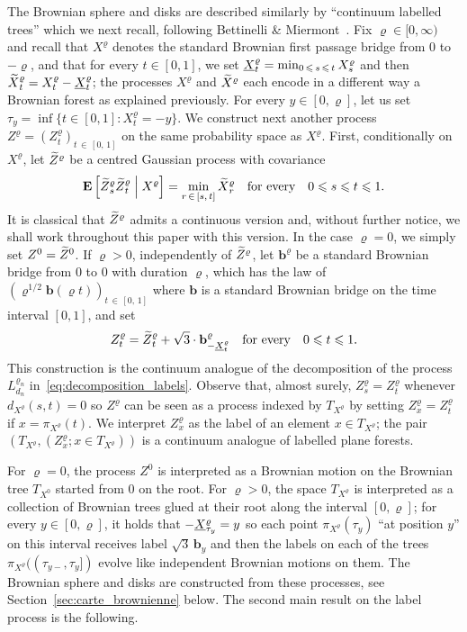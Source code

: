 \documentclass[AHL,Unicode,longabstracts,published]{cedram}
\newcommand{\ensembles}[1]{\mathbf{#1}}
\newcommand{\E}{\ensembles{E}}
\newcommand{\Esc}[2]{\E\left[#1 \;\middle|\; #2\right]}
\newcommand{\1}{\ensembles{1}}
\newcommand{\tildep}[1]{\widetilde{#1}\vphantom{#1}}
\newcommand{\underlinep}[1]{\underline{#1}\vphantom{#1}}
\newcommand{\bb}{\mathbf{b}}
\renewcommand{\le}{\leqslant}
\newcommand{\CRT}{T}
\newcommand{\dCRT}{d}
\newcommand{\Lfn}{L_{d_n}^{\varrho_n}}
\newcommand{\tX}{\tildep{X}^{\varrho}}
\begin{document}
The Brownian sphere and disks are described similarly by ``continuum labelled trees'' which we next recall, following Bettinelli \& Miermont~\cite{BM17}. Fix $\varrho \in [0, \infty)$ and recall that $X^\varrho$ denotes the standard Brownian first passage bridge from $0$ to $-\varrho$, and that for every $t \in [0,1]$, we set $\underlinep{X}^\varrho_t = \min_{0\,\le\,s\,\le\,t} X^\varrho_s$ and then $\tX_t = X^\varrho_t-\underlinep{X}^\varrho_t$; the processes $X^\varrho$ and $\tX$ each encode in a different way a Brownian forest as explained previously. For every $y \in [0,\varrho]$, let us set $\tau_y = \inf\{t \in [0,1] : X^\varrho_t = -y\}$. We construct next another process $Z^\varrho = (Z^\varrho_t)_{t\,\in\,[0,\,1]}$ on the same probability space as $X^\varrho$. First, conditionally on $X^\varrho$, let $\tildep{Z}^\varrho$ be a centred Gaussian process with covariance
\[
\Esc{\tildep{Z}^\varrho_s \tildep{Z}^\varrho_t}{X^\varrho} = \min_{r\,\in\,[s,\,t]} \tX_r
\quad\text{for every}\quad 0 \le s \le t \le 1.
\]
It is classical that $\tildep{Z}^\varrho$ admits a continuous version and, without further notice, we shall work throughout this paper with this version. In the case $\varrho = 0$, we simply set $Z^0 = \tildep{Z}^0$. If $\varrho > 0$, independently of $\tildep{Z}^\varrho$, let $\bb^\varrho$ be a standard Brownian bridge from $0$ to $0$ with duration $\varrho$, which has the law of $(\varrho^{1/2} \bb(\varrho t))_{t\,\in\,[0,\,1]}$ where $\bb$ is a standard Brownian bridge on the time interval $[0,1]$, and set
\[
Z^\varrho_t = \tildep{Z}^\varrho_t + \sqrt{3} \cdot \bb^\varrho_{- \underlinep{X}^\varrho_t}
\quad\text{for every}\quad 0 \le t \le 1.
\]
This construction is the continuum analogue of the decomposition of the process $\Lfn$ in~\eqref{eq:decomposition_labels}. Observe that, almost surely, $Z^\varrho_s = Z^\varrho_t$ whenever $\dCRT_{X^\varrho}(s, t) = 0$ so $Z^\varrho$ can be seen as a process indexed by $\CRT_{X^\varrho}$ by setting $Z^\varrho_x = Z^\varrho_t$ if $x = \pi_{X^\varrho}(t)$. We interpret $Z^\varrho_{x}$ as the label of an element $x \in \CRT_{X^\varrho}$; the pair $(\CRT_{X^\varrho}, (Z^\varrho_x; x \in \CRT_{X^\varrho}))$ is a continuum analogue of labelled plane forests.

For $\varrho = 0$, the process $Z^0$ is interpreted as a Brownian motion on the Brownian tree $\CRT_{X^0}$ started from $0$ on the root. For $\varrho > 0$, the space $\CRT_{X^\varrho}$ is interpreted as a collection of Brownian trees glued at their root along the interval $[0,\varrho]$; for every $y \in [0,\varrho]$, it holds that $- \underlinep{X}^\varrho_{\tau_y} = y$ so each point $\pi_{X^\varrho}(\tau_y)$ ``at position $y$'' on this interval receives label $\sqrt{3} \, \bb_{y}$ and then the labels on each of the trees $\pi_{X^\varrho}((\tau_{y-}, \tau_y])$ evolve like independent Brownian motions on them. The Brownian sphere and disks are constructed from these processes, see Section~\ref{sec:carte_brownienne} below. The second main result on the label process is the following.
\end{document}
